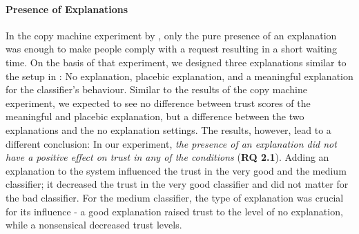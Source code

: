 \paragraph{Presence of Explanations} 
In the copy machine experiment by \cite{langer1978mindlessness}, only the pure presence of an explanation was enough to make people comply with a request resulting in a short waiting time. On the basis of that experiment, we designed three explanations similar to the setup in \cite{langer1978mindlessness}: No explanation, placebic explanation, and a meaningful explanation for the classifier's behaviour. Similar to the results of the copy machine experiment, we expected to see no difference between trust scores of the meaningful and placebic explanation, but a difference between the two explanations and the no explanation settings. The results, however, lead to a different conclusion: In our experiment, \textit{the presence of an explanation did not have a positive effect on trust in any of the conditions} (\textbf{RQ 2.1}). Adding an explanation to the system influenced the trust in the very good and the medium classifier; it decreased the trust in the very good classifier and did not matter for the bad classifier. For the medium classifier, the type of explanation was crucial for its influence - a good explanation raised trust to the level of no explanation, while a nonsensical decreased trust levels.\newline
